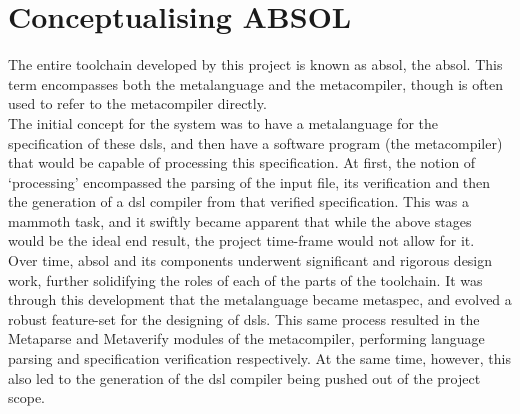 
\section{Conceptualising ABSOL} %
\label{sec:conceptualising_absol}
The entire toolchain developed by this project is known as \acrshort{absol}, the \acrlong{absol}. 
This term encompasses both the metalanguage and the metacompiler, though is often used to refer to the metacompiler directly.\\

The initial concept for the system was to have a metalanguage for the specification of these \glspl{dsl}, and then have a software program (the metacompiler) that would be capable of processing this specification.
At first, the notion of `processing' encompassed the parsing of the input file, its verification and then the generation of a \gls{dsl} compiler from that verified specification. 
This was a mammoth task, and it swiftly became apparent that while the above stages would be the ideal end result, the project time-frame would not allow for it.\\

Over time, \gls{absol} and its components underwent significant and rigorous design work, further solidifying the roles of each of the parts of the toolchain.
It was through this development that the metalanguage became \gls{metaspec}, and evolved a robust feature-set for the designing of \glspl{dsl}.
This same process resulted in the Metaparse and Metaverify modules of the metacompiler, performing language parsing and specification verification respectively.
At the same time, however, this also led to the generation of the \gls{dsl} compiler being pushed out of the project scope.


